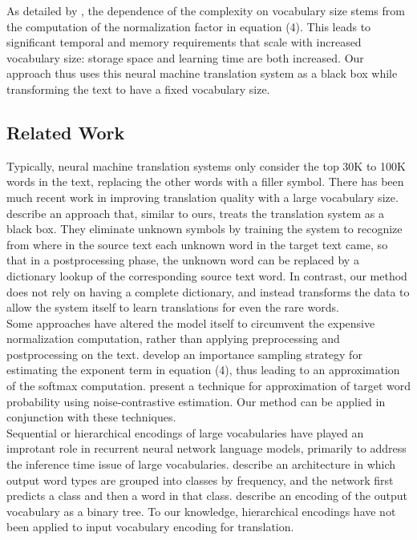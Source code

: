 As detailed by , the dependence of the complexity on vocabulary
size stems from the computation of the normalization factor in equation (4). This leads
to significant temporal and memory requirements that scale with increased vocabulary size: storage space and
learning time are both increased. Our approach thus uses this neural machine
translation system as a black box while transforming the text to have a fixed vocabulary size.

\subsection{Related Work}
Typically, neural machine translation systems only consider the top 30K to 100K words in the text, replacing the other words
with a filler symbol. There has been much recent work in improving translation quality with a large vocabulary size.
 describe an approach
that, similar to ours, treats the translation system as a black box. They eliminate unknown symbols by training the
system to recognize from where in the source text each unknown word in the target text came, so that in a postprocessing
 phase, the unknown word can be replaced by a dictionary lookup of the corresponding source text word. In contrast,
our method does not rely on having a complete dictionary, and instead transforms the data to allow the system itself to
learn translations for even the rare words.\\

Some approaches have altered the model itself to circumvent the expensive normalization computation, rather than
applying preprocessing and postprocessing on the text. 
develop an importance sampling strategy for estimating the exponent term in equation (4), thus leading to
an approximation of the softmax computation. 
present a technique for approximation of target word probability using noise-contrastive estimation. Our method can
be applied in conjunction with these techniques.\\

Sequential or hierarchical encodings of large vocabularies have played an
improtant role in recurrent neural network language models, primarily to
address the inference time issue of large vocabularies. 
describe an architecture in which output word types are grouped into classes by
frequency, and the network first predicts a class and then a word in that
class.  describe an encoding of the output
vocabulary as a binary tree. To our knowledge, hierarchical encodings have not
been applied to input vocabulary encoding for translation.

